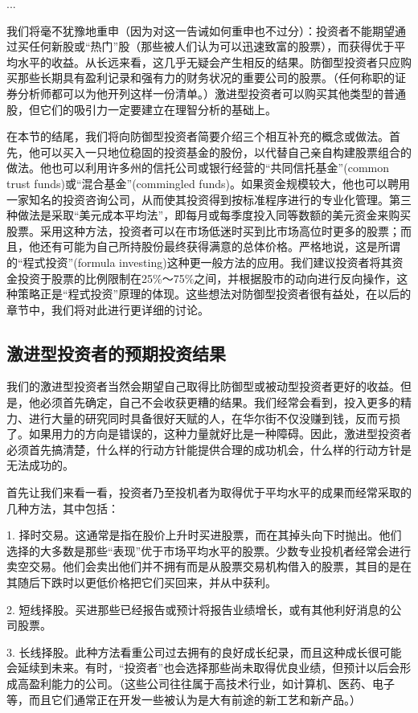 \documentclass[12pt,oneside]{book}
\begin{document}
...

我们将毫不犹豫地重申（因为对这一告诫如何重申也不过分）：投资者不能期望通过买任何新股或“热门”股（那些被人们认为可以迅速致富的股票），而获得优于平均水平的收益。从长远来看，这几乎无疑会产生相反的结果。防御型投资者只应购买那些长期具有盈利记录和强有力的财务状况的重要公司的股票。（任何称职的证券分析师都可以为他开列这样一份清单。）激进型投资者可以购买其他类型的普通股，但它们的吸引力一定要建立在理智分析的基础上。

在本节的结尾，我们将向防御型投资者简要介绍三个相互补充的概念或做法。首先，他可以买入一只地位稳固的投资基金的股份，以代替自己亲自构建股票组合的做法。他也可以利用许多州的信托公司或银行经营的“共同信托基金”(common trust funds)或“混合基金”(commingled funds)。如果资金规模较大，他也可以聘用一家知名的投资咨询公司，从而使其投资得到按标准程序进行的专业化管理。第三种做法是采取“美元成本平均法”，即每月或每季度投入同等数额的美元资金来购买股票。采用这种方法，投资者可以在市场低迷时买到比市场高位时更多的股票；而且，他还有可能为自己所持股份最终获得满意的总体价格。严格地说，这是所谓的“程式投资”(formula investing)这种更一般方法的应用。我们建议投资者将其资金投资于股票的比例限制在25\%～75\%之间，并根据股市的动向进行反向操作，这种策略正是“程式投资”原理的体现。这些想法对防御型投资者很有益处，在以后的章节中，我们将对此进行更详细的讨论。


\subsection{激进型投资者的预期投资结果}
我们的激进型投资者当然会期望自己取得比防御型或被动型投资者更好的收益。但是，他必须首先确定，自己不会收获更糟的结果。我们经常会看到，投入更多的精力、进行大量的研究同时具备很好天赋的人，在华尔街不仅没赚到钱，反而亏损了。如果用力的方向是错误的，这种力量就好比是一种障碍。因此，激进型投资者必须首先搞清楚，什么样的行动方针能提供合理的成功机会，什么样的行动方针是无法成功的。

首先让我们来看一看，投资者乃至投机者为取得优于平均水平的成果而经常采取的几种方法，其中包括：

1. 择时交易。这通常是指在股价上升时买进股票，而在其掉头向下时抛出。他们选择的大多数是那些“表现”优于市场平均水平的股票。少数专业投机者经常会进行卖空交易。他们会卖出他们并不拥有而是从股票交易机构借入的股票，其目的是在其随后下跌时以更低价格把它们买回来，并从中获利。

2. 短线择股。买进那些已经报告或预计将报告业绩增长，或有其他利好消息的公司股票。

3. 长线择股。此种方法看重公司过去拥有的良好成长纪录，而且这种成长很可能会延续到未来。有时，“投资者”也会选择那些尚未取得优良业绩，但预计以后会形成高盈利能力的公司。（这些公司往往属于高技术行业，如计算机、医药、电子等，而且它们通常正在开发一些被认为是大有前途的新工艺和新产品。）
\end{document}
